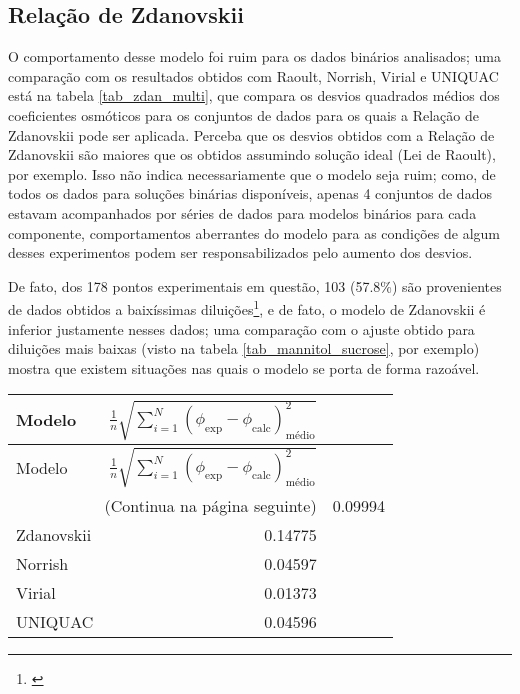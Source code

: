 \documentclass[
	12pt,				%
	openright,
	twoside,
	a4paper,			%
	english,			%
	french,				%
	spanish,			%
	brazil				%
	]{abntex2}
\begin{document}
\subsection{Relação de Zdanovskii}

O comportamento desse modelo foi ruim para os dados binários analisados; uma
comparação com os resultados obtidos com Raoult, Norrish, Virial e UNIQUAC está
na tabela \ref{tab_zdan_multi}, que compara os desvios quadrados médios dos
coeficientes osmóticos para os conjuntos de dados para os quais a Relação de
Zdanovskii pode ser aplicada. Perceba que os desvios obtidos com a Relação de
Zdanovskii são maiores que os obtidos assumindo solução ideal (Lei de Raoult),
por exemplo. Isso não indica necessariamente que o modelo seja ruim; como,
de todos os dados para soluções binárias disponíveis, apenas 4 conjuntos de
dados estavam acompanhados por séries de dados para modelos binários para cada
componente, comportamentos aberrantes do modelo para as condições de algum desses
experimentos podem ser responsabilizados pelo aumento dos desvios.

De fato, dos 178 pontos experimentais em questão, 103 (57.8\%) são provenientes de
dados obtidos a baixíssimas diluições\footnote{\cite{abderafi1994}}, e de fato, o
modelo de Zdanovskii é inferior justamente nesses dados; uma comparação com o ajuste
obtido para diluições mais baixas (visto na tabela \ref{tab_mannitol_sucrose}, por
exemplo) mostra que existem situações nas quais o modelo se porta de forma razoável.

\begin{tabularx}{\textwidth}{ X  r }
	\caption{Comparação com o modelo de Zdanovskii}
	\label{tab_zdan_multi}\\
	\toprule
	Modelo & %
		$\frac{1}{n}\sqrt{\sum_{i=1}^N(\phi_{\text{exp}}-%
		\phi_{\text{calc}})^2_\text{médio}}$\\
	\midrule
	\endfirsthead
	\toprule
	Modelo & %
		$\frac{1}{n}\sqrt{\sum_{i=1}^N(\phi_{\text{exp}}-%
		\phi_{\text{calc}})^2_\text{médio}}$\\\hline
	\midrule
	\endhead
	\midrule
	\multicolumn{2}{r}{\footnotesize(Continua na página seguinte)}
	\endfoot
	\endlastfoot
	Raoult & 0.09994 \\
	Zdanovskii & 0.14775 \\
	Norrish & 0.04597 \\
	Virial & 0.01373 \\
	UNIQUAC & 0.04596 \\\hline
\end{tabularx}
\end{document}
